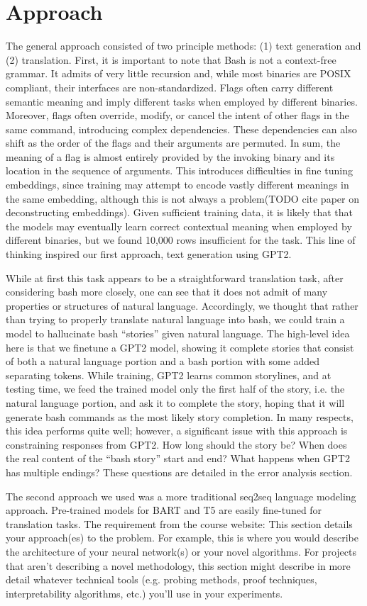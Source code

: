 \documentclass{article}
\begin{document}
\section{Approach}
\color{black}
The general approach consisted of two principle methods: (1) text generation
and (2) translation. First, it is important to note that Bash is not a
context-free grammar. It admits of very little recursion and, while most
binaries are POSIX compliant, their interfaces are non-standardized. Flags
often carry different semantic meaning and imply different tasks when employed
by different binaries. Moreover, flags often override, modify, or cancel the
intent of other flags in the same command, introducing complex dependencies.
These dependencies can also shift as the order of the flags and their arguments
are permuted. In sum, the meaning of a flag is almost entirely provided by the
invoking binary and its location in the sequence of arguments. This introduces
difficulties in fine tuning embeddings, since training may attempt to encode
vastly different meanings in the same embedding, although this is not always a
problem(TODO cite paper on deconstructing embeddings). Given sufficient
training data, it is likely that that the models may eventually learn correct
contextual meaning when employed by different binaries, but we found 10,000
rows insufficient for the task. This line of thinking inspired our first
approach, text generation using GPT2.
\par
While at first this task appears to be a straightforward translation task,
after considering bash more closely, one can see that it does not admit of many
properties or structures of natural language. Accordingly, we thought that
rather than trying to properly translate natural language into bash, we could
train a model to hallucinate bash ``stories'' given natural language. The
high-level idea here is that we finetune a GPT2 model, showing it complete
stories that consist of both a natural language portion and a bash portion with
some added separating tokens. While training, GPT2 learns common storylines,
and at testing time, we feed the trained model only the first half of the
story, i.e. the natural language portion, and ask it to complete the story,
hoping that it will generate bash commands as the most likely story completion.
In many respects, this idea performs quite well; however, a significant issue
with this approach is constraining responses from GPT2. How long should the
story be? When does the real content of the ``bash story'' start and end? What
happens when GPT2 has multiple endings? These questions are detailed in the
error analysis section.
\par
The second approach we used was a more traditional seq2seq language modeling
approach. Pre-trained models for BART and T5 are easily fine-tuned for
translation tasks. The requirement from the course website: This section
details your approach(es) to the problem. For example, this is where you would
describe the architecture of your neural network(s) or your novel algorithms.
For projects that aren’t describing a novel methodology, this section might
describe in more detail whatever technical tools (e.g. probing methods, proof
techniques, interpretability algorithms, etc.) you’ll use in your experiments.
\end{document}
